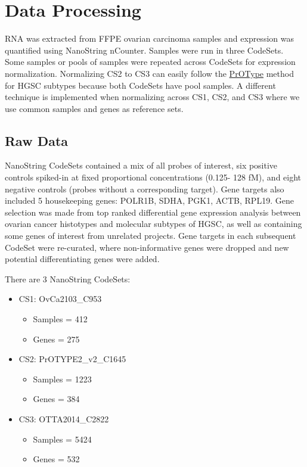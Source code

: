 \documentclass[
]{report}
\providecommand{\tightlist}{%
  \setlength{\itemsep}{0pt}\setlength{\parskip}{0pt}}
\begin{document}
\hypertarget{data-processing}{%
\section{Data Processing}\label{data-processing}}

RNA was extracted from FFPE ovarian carcinoma samples and expression was quantified using NanoString nCounter. Samples were run in three CodeSets. Some samples or pools of samples were repeated across CodeSets for expression normalization. Normalizing CS2 to CS3 can easily follow the \href{https://dchiu911.shinyapps.io/PrOType/}{PrOType} method for HGSC subtypes because both CodeSets have pool samples. A different technique is implemented when normalizing across CS1, CS2, and CS3 where we use common samples and genes as reference sets.

\hypertarget{raw-data}{%
\subsection{Raw Data}\label{raw-data}}

NanoString CodeSets contained a mix of all probes of interest, six positive controls spiked-in at fixed proportional concentrations (0.125- 128 fM), and eight negative controls (probes without a corresponding target). Gene targets also included 5 housekeeping genes: POLR1B, SDHA, PGK1, ACTB, RPL19. Gene selection was made from top ranked differential gene expression analysis between ovarian cancer histotypes and molecular subtypes of HGSC, as well as containing some genes of interest from unrelated projects. Gene targets in each subsequent CodeSet were re-curated, where non-informative genes were dropped and new potential differentiating genes were added.

There are 3 NanoString CodeSets:

\begin{itemize}
\item
  CS1: OvCa2103\_C953

  \begin{itemize}
  \tightlist
  \item
    Samples = 412
  \item
    Genes = 275
  \end{itemize}
\item
  CS2: PrOTYPE2\_v2\_C1645

  \begin{itemize}
  \tightlist
  \item
    Samples = 1223
  \item
    Genes = 384
  \end{itemize}
\item
  CS3: OTTA2014\_C2822

  \begin{itemize}
  \tightlist
  \item
    Samples = 5424
  \item
    Genes = 532
  \end{itemize}
\end{itemize}
\end{document}
